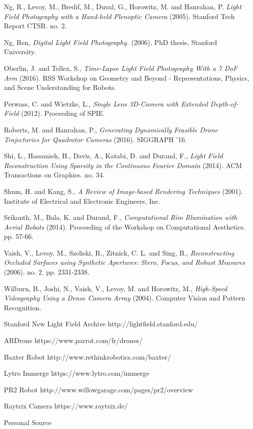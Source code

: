 \documentclass[12pt]{report}
\begin{document}
\begin{thebibliography}{10}
	Ng, R., Levoy, M., Bredif, M., Duval, G., Horowitz, M. and Hanrahan, P. \emph{Light Field Photography with a Hand-held Plenoptic Camera} (2005). Stanford Tech Report CTSR. no. 2.

	Ng, Ren, \emph{Digital Light Field Photography.} (2006). PhD thesis, Stanford University.	

	Oberlin, J. and Tellex, S., \emph{Time-Lapse Light Field Photography With a 7 DoF Arm} (2016). RSS Workshop on Geometry and Beyond - Representations, Physics, and Scene Understanding for Robots. 

	Perwass, C. and Wietzke, L., \emph{Single Lens 3D-Camera with Extended Depth-of-Field} (2012). Proceeding of SPIE.

	Roberts, M. and Hanrahan, P., \emph{Generating Dynamically Feasible Drone Trajectories for Quadrotor Cameras} (2016). SIGGRAPH '16.

	Shi, L., Hassanieh, H., Davis, A., Katabi, D. and Durand, F., \emph{Light Field Reconstruction Using Sparsity in the Continuous Fourier Domain} (2014). ACM Transactions on Graphics. no. 34.

	Shum, H. and Kang, S., \emph{A Review of Image-based Rendering Techniques} (2001). Institute of Electrical and Electronic Engineers, Inc.

	Srikanth, M., Bala, K. and Durand, F., \emph{Computational Rim Illumination with Aerial Robots} (2014). Proceeding of the Workshop on Computational Aesthetics. pp. 57-66.

	Vaish, V., Levoy, M., Szeliski, R., Zitnick, C. L. and Sing, B., \emph{Reconstructing Occluded Surfaces using Synthetic Apertures: Stero, Focus, and Robust Measures} (2006). no. 2. pp. 2331-2338.
	
	Wilburn, B., Joshi, N., Vaish, V., Levoy, M. and Horowitz, M., \emph{High-Speed Videography Using a Dense Camera Array} (2004). Computer Vision and Pattern Recognition.

	Stanford New Light Field Archive http://lightfield.stanford.edu/

	ARDrone https://www.parrot.com/fr/drones/

	Baxter Robot http://www.rethinkrobotics.com/baxter/
	
	Lytro Immerge https://www.lytro.com/immerge
	
	PR2 Robot http://www.willowgarage.com/pages/pr2/overview
	
	Raytrix Camera https://www.raytrix.de/
	
	Personal Source

\end{thebibliography}
\end{document}
